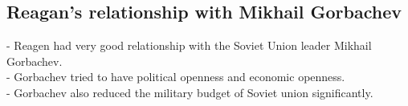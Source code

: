 \documentclass{article}
\begin{document}
\subsection{Reagan's relationship with Mikhail Gorbachev}
- Reagen had very good relationship with the Soviet Union leader Mikhail Gorbachev.\\
- Gorbachev tried to have political openness and economic openness.\\
- Gorbachev also reduced the military budget of Soviet union significantly.\\
\end{document}
